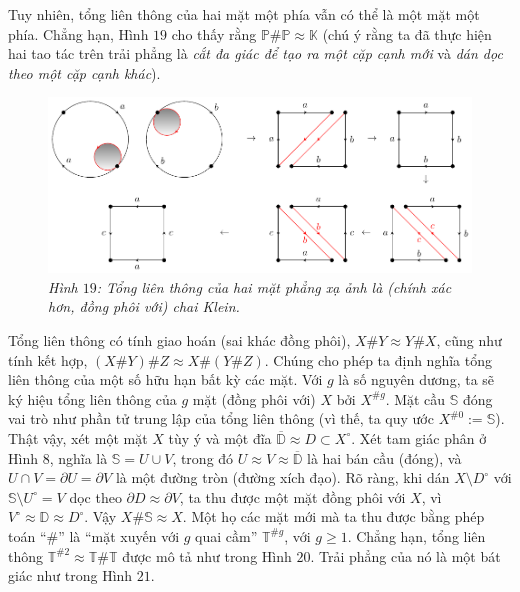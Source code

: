 \begin{multicols}{2}
\begin{center}
	\end{center}
	Tuy nhiên, tổng liên thông của hai mặt một phía vẫn có thể là một mặt một phía. Chẳng hạn, Hình $19$ cho thấy rằng $\mathbb{P} \# \mathbb{P} \approx \mathbb{K}$ (chú ý rằng ta đã thực hiện hai tao tác trên trải phẳng là {\it cắt đa giác để tạo ra một cặp cạnh mới} và {\it dán dọc theo một cặp cạnh khác}). 
	\begin{figure}[H]
		\vspace*{-5pt}
		\centering\captionsetup{labelformat=empty, justification=centering}
		\includegraphics[width=1\linewidth]{H19.pdf}
		\caption{\small\textit{\color{duongvaotoanhoc}Hình $19$: Tổng liên thông của hai mặt phẳng xạ ảnh là (chính xác hơn, đồng phôi với) chai Klein.}}
		\vspace*{-10pt}
	\end{figure}
	Tổng liên thông có tính giao hoán (sai khác đồng phôi), $X \# Y \approx Y \# X$, cũng như tính kết hợp, $(X \# Y) \# Z \approx X \# (Y \# Z)$. Chúng cho phép ta định nghĩa tổng liên thông của một số hữu hạn bất kỳ các mặt. Với $g$ là số nguyên dương, ta sẽ ký hiệu tổng liên thông của $g$ mặt (đồng phôi với) $X$ bởi $X^{\# g}$. Mặt cầu $\mathbb{S}$ đóng vai trò như phần tử trung lập của tổng liên thông (vì thế, ta quy ước $X^{\# 0} := \mathbb{S}$). Thật vậy, xét một mặt $X$ tùy ý và một đĩa $\overline{\mathbb{D}} \approx D \subset X^\circ$. Xét tam giác phân ở Hình $8$, nghĩa là $\mathbb{S} = U \cup V$, trong đó $U \approx V \approx \overline{\mathbb{D}}$ là hai bán cầu (đóng), và $U \cap V = \partial U = \partial V$ là một đường tròn (đường xích đạo). Rõ ràng, khi dán $X \setminus D^\circ$ với $\mathbb{S} \setminus U^\circ = V$ dọc theo $\partial D \approx \partial V$, ta thu được một mặt đồng phôi với $X$, vì $V^\circ \approx \mathbb{D} \approx D^\circ$. Vậy $X \# \mathbb{S} \approx X$.
	\vskip 0.1cm
	Một họ các mặt mới mà ta thu được bằng phép toán ``$\#$'' là ``mặt xuyến với $g$ quai cầm'' $\mathbb{T}^{\# g}$, với $g \ge 1$. Chẳng hạn, tổng liên thông $\mathbb{T}^{\#2} \approx \mathbb{T} \# \mathbb{T}$ được mô tả như trong Hình $20$. Trải phẳng của nó là một bát giác như trong Hình $21$.

\end{multicols}
